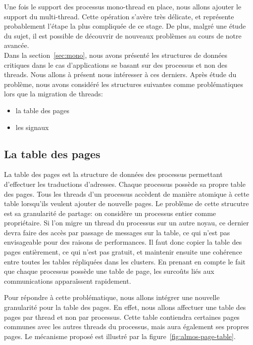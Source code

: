     Une fois le support des processus mono-thread en place, nous allons ajouter
    le support du multi-thread. Cette opération s'avère très délicate, et
    représente probablement l'étape la plus compliquée de ce stage. De plus,
    malgré une étude du sujet, il est possible de découvrir de nouveaux
    problèmes au cours de notre avancée.\\

    Dans la section~\ref{sec:mono}, nous avons présenté les structures de
    données critiques dans le cas d'applications se basant sur des processus et
    non des threads. Nous allons à présent nous intéresser à ces derniers. Après
    étude du problème, nous avons considéré les structures suivantes comme
    problématiques lors que la migration de threads:
    \begin{itemize}
      \item la table des pages
      \item les signaux
    \end{itemize}  

    \subsection{La table des pages}

      La table des pages est la structure de données des processus permettant
      d'effectuer les traductions d'adresses. Chaque processus possède sa propre
      table des pages. Tous les threads d'un processus accèdent de manière
      atomique à cette table lorsqu'ils veulent ajouter de nouvelle pages. Le
      problème de cette strucutre est sa granularité de partage: on considère un
      processus entier comme propriétaire. Si l'on migre un thread du processus
      sur un autre noyau, ce dernier devra faire des accès par passage de
      messages sur la table, ce qui n'est pas envisageable pour des raisons de
      performances. Il faut donc copier la table des pages entièrement, ce qui
      n'est pas gratuit, et maintenir ensuite une cohérence entre toutes les
      tables répliquées dans les clusters. En prenant en compte le fait que
      chaque processus possède une table de page, les surcoûts liés aux
      communications apparaîssent rapidement.

      Pour répondre à cette problématique, nous allons intégrer une nouvelle
      granularité pour la table des pages. En effet, nous allons affectuer une
      table des pages par thread et non par processus. Cette table contiendra
      certaines pages communes avec les autres threads du processus, mais aura
      également ses propres pages. Le mécanisme proposé est illustré par la
      figure~\ref{fig:almos-page-table}.

